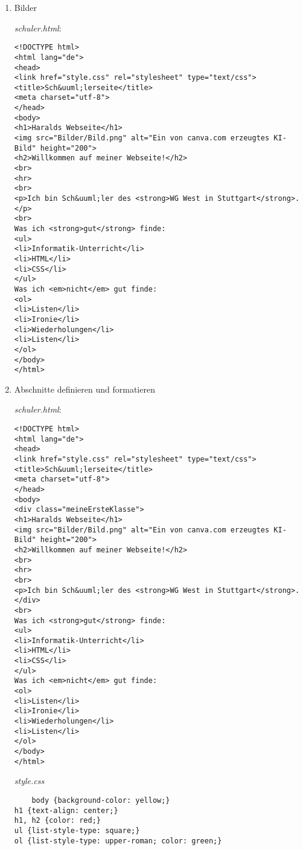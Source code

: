 \begin{enumerate}
    \textit{schuler.html}:
    \begin{lstlisting}
<!DOCTYPE html>
<html lang="de">
<head>
<link href="style.css" rel="stylesheet" type="text/css">
<title>Sch&uuml;lerseite</title>
<meta charset="utf-8">
</head>
<body>
<h1>Haralds Webseite</h1>
<h2>Willkommen auf meiner Webseite!</h2>
<br>
<hr>
<br>
<p>Ich bin Sch&uuml;ler des <strong>WG West in Stuttgart</strong>.</p>
<br>
Was ich <strong>gut</strong> finde:
<ul>
<li>Informatik-Unterricht</li>
<li>HTML</li>
<li>CSS</li>
</ul>
Was ich <em>nicht</em> gut finde:
<ol>
<li>Listen</li>
<li>Ironie</li>
<li>Wiederholungen</li>
<li>Listen</li>
</ol>
</body>
</html>
    \end{lstlisting}
    \textit{style.css}
    \begin{lstlisting}
body {background-color: yellow;}
h1 {text-align: center;}
h1, h2 {color: red;}
ul {list-style-type: square;}
ol {list-style-type: upper-roman; color: green;}
    \end{lstlisting}
    \item Bilder

    \textit{schuler.html}:
    \begin{lstlisting}
<!DOCTYPE html>
<html lang="de">
<head>
<link href="style.css" rel="stylesheet" type="text/css">
<title>Sch&uuml;lerseite</title>
<meta charset="utf-8">
</head>
<body>
<h1>Haralds Webseite</h1>
<img src="Bilder/Bild.png" alt="Ein von canva.com erzeugtes KI-Bild" height="200">
<h2>Willkommen auf meiner Webseite!</h2>
<br>
<hr>
<br>
<p>Ich bin Sch&uuml;ler des <strong>WG West in Stuttgart</strong>.</p>
<br>
Was ich <strong>gut</strong> finde:
<ul>
<li>Informatik-Unterricht</li>
<li>HTML</li>
<li>CSS</li>
</ul>
Was ich <em>nicht</em> gut finde:
<ol>
<li>Listen</li>
<li>Ironie</li>
<li>Wiederholungen</li>
<li>Listen</li>
</ol>
</body>
</html>
    \end{lstlisting}
    \item Abschnitte definieren und formatieren

    \textit{schuler.html}:
    \begin{lstlisting}
<!DOCTYPE html>
<html lang="de">
<head>
<link href="style.css" rel="stylesheet" type="text/css">
<title>Sch&uuml;lerseite</title>
<meta charset="utf-8">
</head>
<body>
<div class="meineErsteKlasse">
<h1>Haralds Webseite</h1>
<img src="Bilder/Bild.png" alt="Ein von canva.com erzeugtes KI-Bild" height="200">
<h2>Willkommen auf meiner Webseite!</h2>
<br>
<hr>
<br>
<p>Ich bin Sch&uuml;ler des <strong>WG West in Stuttgart</strong>.
</div>
<br>
Was ich <strong>gut</strong> finde:
<ul>
<li>Informatik-Unterricht</li>
<li>HTML</li>
<li>CSS</li>
</ul>
Was ich <em>nicht</em> gut finde:
<ol>
<li>Listen</li>
<li>Ironie</li>
<li>Wiederholungen</li>
<li>Listen</li>
</ol>
</body>
</html>
    \end{lstlisting}
    \textit{style.css}
    \begin{lstlisting}
    body {background-color: yellow;}
h1 {text-align: center;}
h1, h2 {color: red;}
ul {list-style-type: square;}
ol {list-style-type: upper-roman; color: green;}


\end{lstlisting}
\end{enumerate}
